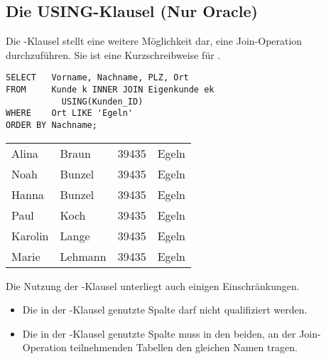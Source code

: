 \subsection{Die USING-Klausel (Nur Oracle)}
Die -Klausel stellt eine weitere Möglichkeit dar, eine Join-Operation durchzuführen. Sie ist eine Kurzschreibweise für .
\clearpage
\begin{lstlisting}[language=oracle_sql,caption={Die USING-Klausel},label=sql04_06]
SELECT   Vorname, Nachname, PLZ, Ort
FROM     Kunde k INNER JOIN Eigenkunde ek
           USING(Kunden_ID)
WHERE    Ort LIKE 'Egeln'
ORDER BY Nachname;
        \end{lstlisting}
\begin{center}
    \begin{small}
        \tablehead{}
        \begin{oraclesql}
            \begin{supertabular}{llll}
                Alina & Braun & 39435 & Egeln \\
                Noah & Bunzel & 39435 & Egeln \\
                Hanna & Bunzel & 39435 & Egeln \\
                Paul & Koch & 39435 & Egeln \\
                Karolin & Lange & 39435 & Egeln \\
                Marie & Lehmann & 39435 & Egeln \\
            \end{supertabular}
        \end{oraclesql}
    \end{small}
\end{center}
Die Nutzung der -Klausel unterliegt auch einigen Einschränkungen.
\begin{itemize}
    \item Die in der -Klausel genutzte Spalte darf nicht qualifiziert werden.
    \item Die in der -Klausel genutzte Spalte muss in den beiden, an der Join-Operation teilnehmenden Tabellen den gleichen Namen tragen.
\end{itemize}
